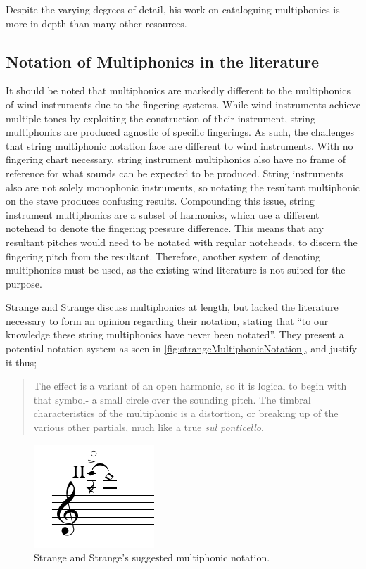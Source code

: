   Despite the varying degrees of detail, his work on cataloguing multiphonics is more in depth than many other resources.

 

\subsection{Notation of Multiphonics in the literature}

It should be noted that multiphonics are markedly different to the multiphonics of wind instruments due to the fingering systems.\label{sec:multiphonicsWoodwind}
While wind instruments achieve multiple tones by exploiting the construction of their instrument, string multiphonics are produced agnostic of specific fingerings.
As such, the challenges that string multiphonic notation face are different to wind instruments.
With no fingering chart necessary, string instrument multiphonics also have no frame of reference for what sounds can be expected to be produced.
String instruments also are not solely monophonic instruments, so notating the resultant multiphonic on the stave produces confusing results.
Compounding this issue, string instrument multiphonics are a subset of harmonics, which use a different notehead to denote the fingering pressure difference.
This means that any resultant pitches would need to be notated with regular noteheads, to discern the fingering pitch from the resultant.
Therefore, another system of denoting multiphonics must be used, as the existing wind literature is not suited for the purpose.

Strange and Strange discuss multiphonics at length, but lacked the literature necessary to form an opinion regarding their notation, stating that ``to our knowledge these string multiphonics have never been notated''.\autocite[132--134]{strangeContemporaryViolinExtended2001}
They present a potential notation system as seen in \autoref{fig:strangeMultiphonicNotation}, and justify it thus;

\begin{quote}
  The effect is a variant of an open harmonic, so it is logical to begin with that symbol- a small circle over the sounding pitch. 
  The timbral characteristics of the multiphonic is a distortion, or breaking up of the various other partials, much like a true \emph{sul ponticello}.\autocite[134]{strangeContemporaryViolinExtended2001}
\end{quote}

  \begin{figure}
    \centering
    \includegraphics{./resources/strangeMultiphonicNotation.pdf}
    \caption{Strange and Strange's suggested multiphonic notation.}\label{fig:strangeMultiphonicNotation}\end{figure}


